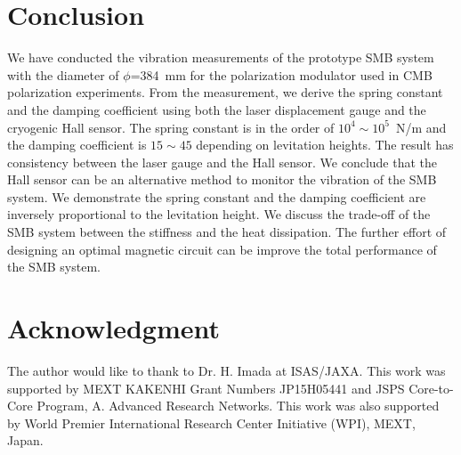 \documentclass[a4paper,11pt]{jpconf}
\begin{document}
\section{Conclusion}
We have conducted the vibration measurements of the prototype SMB system with the diameter of $\phi$=384~mm for the polarization modulator used in CMB polarization experiments.
From the measurement, we derive the spring constant and the damping coefficient using both the laser displacement gauge and the cryogenic Hall sensor.
The spring constant is in the order of $10^{4} \sim 10^{5}$~N/m and the damping coefficient is $15\sim45$ depending on levitation heights.
The result has consistency between the laser gauge and the Hall sensor.
We conclude that the Hall sensor can be an alternative method to monitor the vibration of the SMB system.
We demonstrate the spring constant and the damping coefficient are inversely proportional to the levitation height.
We discuss the trade-off of the SMB system between the stiffness and the heat dissipation.
The further effort of designing an optimal magnetic circuit can be improve the total performance of the SMB system.

\section{Acknowledgment}
The author would like to thank to Dr. H. Imada at ISAS/JAXA.
This work was supported by MEXT KAKENHI Grant Numbers JP15H05441 and JSPS Core-to-Core Program, A. Advanced Research Networks.
This work was also supported by World Premier International Research Center Initiative (WPI), MEXT, Japan.
\end{document}
